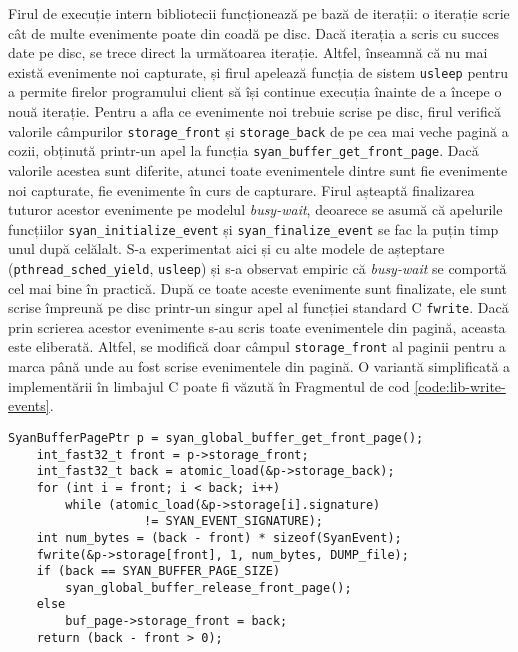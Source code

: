 Firul de execuție intern bibliotecii funcționează pe bază de iterații:
o iterație scrie cât de multe evenimente poate din coadă pe disc. Dacă
iterația a scris cu succes date pe disc, se trece direct la următoarea
iterație. Altfel, înseamnă că nu mai există evenimente noi capturate, și
firul apelează funcția de sistem \lstinline{usleep} pentru a permite
firelor programului client să își continue execuția înainte de a începe
o nouă iterație. Pentru a afla ce evenimente noi trebuie scrise pe disc,
firul verifică valorile câmpurilor \lstinline{storage_front} și
\lstinline{storage_back} de pe cea mai veche pagină a cozii, obținută
printr-un apel la funcția \lstinline{syan_buffer_get_front_page}. Dacă
valorile acestea sunt diferite, atunci toate evenimentele dintre sunt
fie evenimente noi capturate, fie evenimente în curs de capturare. Firul
așteaptă finalizarea tuturor acestor evenimente pe modelul
\textit{busy-wait}, deoarece se asumă că apelurile funcțiilor
\lstinline{syan_initialize_event} și \lstinline{syan_finalize_event}
se fac la puțin timp unul după celălalt. S-a experimentat aici și cu
alte modele de așteptare (\lstinline{pthread_sched_yield},
\lstinline{usleep}) și s-a observat empiric că \textit{busy-wait} se
comportă cel mai bine în practică. După ce toate aceste evenimente sunt
finalizate, ele sunt scrise împreună pe disc printr-un singur apel al
funcției standard C \lstinline{fwrite}. Dacă prin scrierea acestor
evenimente s-au scris toate evenimentele din pagină, aceasta este
eliberată. Altfel, se modifică doar câmpul \lstinline{storage_front} al
paginii pentru a marca până unde au fost scrise evenimentele din pagină.
O variantă simplificată a implementării în limbajul C poate fi văzută
în Fragmentul de cod \ref{code:lib-write-events}.

\begin{lstlisting}[caption=Scrierea evenimentelor pe disc,
                   label=code:lib-write-events,
                   float, floatplacement=H]
    SyanBufferPagePtr p = syan_global_buffer_get_front_page();
    int_fast32_t front = p->storage_front;
    int_fast32_t back = atomic_load(&p->storage_back);
    for (int i = front; i < back; i++)
        while (atomic_load(&p->storage[i].signature)
                   != SYAN_EVENT_SIGNATURE);
    int num_bytes = (back - front) * sizeof(SyanEvent);
    fwrite(&p->storage[front], 1, num_bytes, DUMP_file);
    if (back == SYAN_BUFFER_PAGE_SIZE)
        syan_global_buffer_release_front_page();
    else
        buf_page->storage_front = back;
    return (back - front > 0);
\end{lstlisting}

